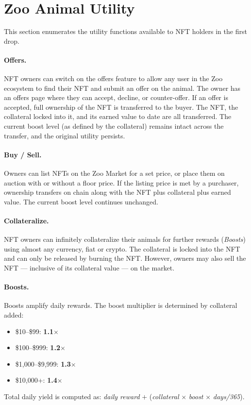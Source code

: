 \section{Zoo Animal Utility}
\label{sec:utility}

This section enumerates the utility functions available to NFT holders in the first drop.

\paragraph{Offers.} NFT owners can switch on the offers feature to allow any user in the Zoo ecosystem to find their NFT and submit an offer on the animal. The owner has an offers page where they can accept, decline, or counter-offer. If an offer is accepted, full ownership of the NFT is transferred to the buyer. The NFT, the collateral locked into it, and its earned value to date are all transferred. The current boost level (as defined by the collateral) remains intact across the transfer, and the original utility persists.

\paragraph{Buy / Sell.} Owners can list NFTs on the Zoo Market for a set price, or place them on auction with or without a floor price. If the listing price is met by a purchaser, ownership transfers on chain along with the NFT plus collateral plus earned value. The current boost level continues unchanged.

\paragraph{Collateralize.} NFT owners can infinitely collateralize their animals for further rewards (\emph{Boosts}) using almost any currency, fiat or crypto. The collateral is locked into the NFT and can only be released by burning the NFT. However, owners may also sell the NFT --- inclusive of its collateral value --- on the market.

\paragraph{Boosts.} Boosts amplify daily rewards. The boost multiplier is determined by collateral added:
\begin{itemize}
  \item \$10--\$99: \textbf{1.1$\times$}
  \item \$100--\$999: \textbf{1.2$\times$}
  \item \$1{,}000--\$9{,}999: \textbf{1.3$\times$}
  \item \$10{,}000+: \textbf{1.4$\times$}
\end{itemize}
Total daily yield is computed as: \emph{daily reward} $+$ (\emph{collateral} $\times$ \emph{boost} $\times$ \emph{days/365}).


